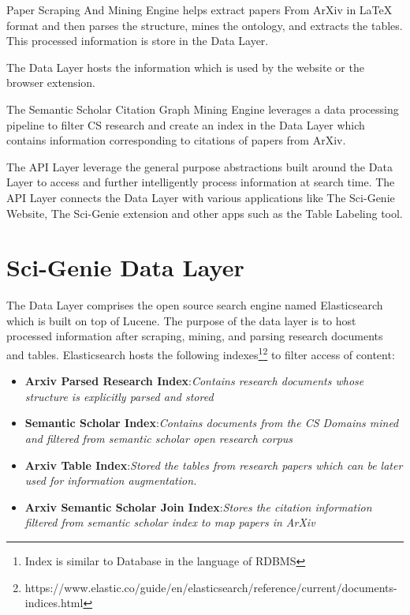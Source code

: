 Paper Scraping And Mining Engine helps extract papers From ArXiv in LaTeX format and then parses the structure, mines the ontology, and extracts the tables. This processed information is store in the Data Layer. 

The Data Layer hosts the information which is used by the website or the browser extension. 

The Semantic Scholar Citation Graph Mining Engine leverages a data processing pipeline to filter CS research and create an index in the Data Layer which contains information corresponding to citations of papers from ArXiv. 

The API Layer leverage the general purpose abstractions built around the Data Layer to access and further intelligently process information at search time. The API Layer connects the Data Layer with various applications like The Sci-Genie Website, The Sci-Genie extension and other apps such as the Table Labeling tool. 

\section{Sci-Genie Data Layer}
\label{sci-genie-core:data-layer}
The Data Layer comprises the open source search engine named Elasticsearch\parencite{gormley2015elasticsearch} which is built on top of Lucene. 
The purpose of the data layer is to host processed information after scraping, mining, and parsing research documents and tables. 
Elasticsearch hosts the following indexes\footnote{Index is similar to Database in the language of RDBMS}\footnote{https://www.elastic.co/guide/en/elasticsearch/reference/current/documents-indices.html} to filter access of content:
\begin{itemize}
    \item \textbf{Arxiv Parsed Research Index}:\textit{Contains research documents whose structure is explicitly parsed and stored}
    \item \textbf{Semantic Scholar Index}:\textit{Contains documents from the CS Domains mined and filtered from semantic scholar open research corpus}
    \item \textbf{Arxiv Table Index}:\textit{Stored the tables from research papers which can be later used for information augmentation.}
    \item \textbf{Arxiv Semantic Scholar Join Index}:\textit{Stores the citation information filtered from semantic scholar index to map papers in ArXiv} 
\end{itemize} 

